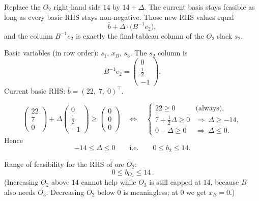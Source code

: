\begin{ideabox}
Replace the \(O_2\) right-hand side \(14\) by \(14+\Delta\). The current basis stays feasible
as long as every basic RHS stays non-negative. Those new RHS values equal
\[
  \bar{b} + \Delta\cdot\bigl(B^{-1}e_2\bigr),
\]
and the column \(B^{-1}e_2\) is exactly the final-tableau column of the \(O_2\) slack \(s_2\).
\end{ideabox}

Basic variables (in row order): \(s_1\), \(x_B\), \(s_3\). The \(s_2\) column is
\[
  B^{-1}e_2 =
  \begin{pmatrix} 0 \\ \tfrac12 \\ -1 \end{pmatrix}.
\]
Current basic RHS: \(\bar{b}=(22,\;7,\;0)^\top\).

\[
\begin{pmatrix} 22 \\ 7 \\ 0 \end{pmatrix}
+
\Delta
\begin{pmatrix} 0 \\ \tfrac12 \\ -1 \end{pmatrix}
\ge
\begin{pmatrix} 0 \\ 0 \\ 0 \end{pmatrix}
\quad\Longleftrightarrow\quad
\begin{cases}
  22 \ge 0 & \text{(always)},\\
  7+\tfrac12\Delta \ge 0 & \Rightarrow\ \Delta\ge -14,\\
  0-\Delta \ge 0 & \Rightarrow\ \Delta\le 0.
\end{cases}
\]
Hence
\[
  -14\le\Delta\le 0
  \qquad\text{i.e.}\qquad
  0\le b_2\le 14.
\]

\begin{resultbox}[title={Part (b)}]
Range of feasibility for the RHS of ore \(O_2\):
\[
  \boxed{\,0\le b_{O_2}\le 14\,}.
\]
(Increasing \(O_2\) above \(14\) cannot help while \(O_3\) is still capped at \(14\), because
\(B\) also needs \(O_3\). Decreasing \(O_2\) below \(0\) is meaningless; at \(0\) we get
\(x_B=0\).)
\end{resultbox}


